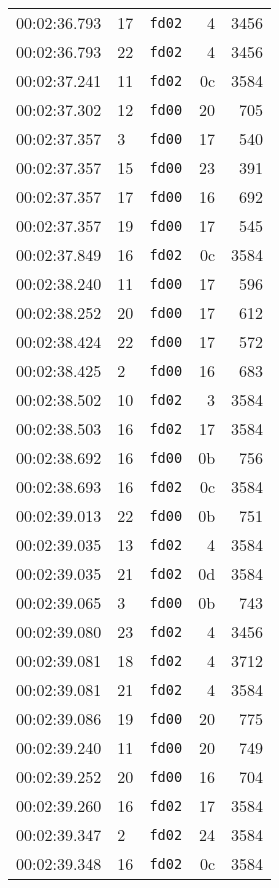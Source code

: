 \documentclass{article}
\begin{document}
\begin{longtable}{lllrr}
00:02:36.793 & 17 & \texttt{fd02} & 4 & 3456 \\
00:02:36.793 & 22 & \texttt{fd02} & 4 & 3456 \\
00:02:37.241 & 11 & \texttt{fd02} & 0c & 3584 \\
00:02:37.302 & 12 & \texttt{fd00} & 20 & 705 \\
00:02:37.357 & 3 & \texttt{fd00} & 17 & 540 \\
00:02:37.357 & 15 & \texttt{fd00} & 23 & 391 \\
00:02:37.357 & 17 & \texttt{fd00} & 16 & 692 \\
00:02:37.357 & 19 & \texttt{fd00} & 17 & 545 \\
00:02:37.849 & 16 & \texttt{fd02} & 0c & 3584 \\
00:02:38.240 & 11 & \texttt{fd00} & 17 & 596 \\
00:02:38.252 & 20 & \texttt{fd00} & 17 & 612 \\
00:02:38.424 & 22 & \texttt{fd00} & 17 & 572 \\
00:02:38.425 & 2 & \texttt{fd00} & 16 & 683 \\
00:02:38.502 & 10 & \texttt{fd02} & 3 & 3584 \\
00:02:38.503 & 16 & \texttt{fd02} & 17 & 3584 \\
00:02:38.692 & 16 & \texttt{fd00} & 0b & 756 \\
00:02:38.693 & 16 & \texttt{fd02} & 0c & 3584 \\
00:02:39.013 & 22 & \texttt{fd00} & 0b & 751 \\
00:02:39.035 & 13 & \texttt{fd02} & 4 & 3584 \\
00:02:39.035 & 21 & \texttt{fd02} & 0d & 3584 \\
00:02:39.065 & 3 & \texttt{fd00} & 0b & 743 \\
00:02:39.080 & 23 & \texttt{fd02} & 4 & 3456 \\
00:02:39.081 & 18 & \texttt{fd02} & 4 & 3712 \\
00:02:39.081 & 21 & \texttt{fd02} & 4 & 3584 \\
00:02:39.086 & 19 & \texttt{fd00} & 20 & 775 \\
00:02:39.240 & 11 & \texttt{fd00} & 20 & 749 \\
00:02:39.252 & 20 & \texttt{fd00} & 16 & 704 \\
00:02:39.260 & 16 & \texttt{fd02} & 17 & 3584 \\
00:02:39.347 & 2 & \texttt{fd02} & 24 & 3584 \\
00:02:39.348 & 16 & \texttt{fd02} & 0c & 3584 \\

\end{longtable}
\end{document}
